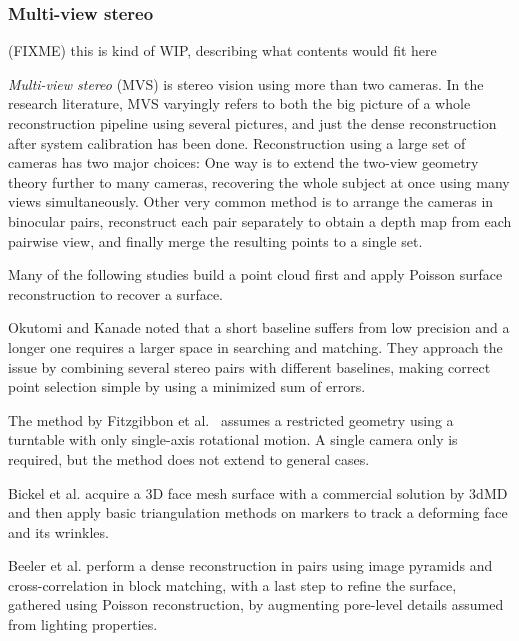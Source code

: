 
\subsubsection{Multi-view stereo} %


{ \color{red} (FIXME) this is kind of WIP, describing what contents would fit here }

\emph{Multi-view stereo} (MVS) is stereo vision using more than two cameras.
In the research literature, MVS varyingly refers to both the big picture of a whole reconstruction pipeline using several pictures, and just the dense reconstruction after system calibration has been done.
Reconstruction using a large set of cameras has two major choices:
One way is to extend the two-view geometry theory further to many cameras, recovering the whole subject at once using many views simultaneously.
Other very common method is to arrange the cameras in binocular pairs, reconstruct each pair separately to obtain a depth map from each pairwise view, and finally merge the resulting points to a single set.

Many of the following studies build a point cloud first and apply Poisson surface reconstruction to recover a surface. \cite{kazhdan2006poisson}

Okutomi and Kanade \cite{okutomi1993multiple} noted that a short baseline suffers from low precision and a longer one requires a larger space in searching and matching.
They approach the issue by combining several stereo pairs with different baselines, making correct point selection simple by using a minimized sum of errors.

The method by Fitzgibbon et al.\ \cite{fitzgibbon1998automatic} assumes a restricted geometry using a turntable with only single-axis rotational motion.
A single camera only is required, but the method does not extend to general cases.

Bickel et al. acquire a 3D face mesh surface with a commercial solution by 3dMD \cite{3dmd} and then apply basic triangulation methods on markers to track a deforming face and its wrinkles. \cite{bickel2007multi}

Beeler et al. perform a dense reconstruction in pairs using image pyramids and cross-correlation in block matching, with a last step to refine the surface, gathered using Poisson reconstruction, by augmenting pore-level details assumed from lighting properties. \cite{beeler2010high}


